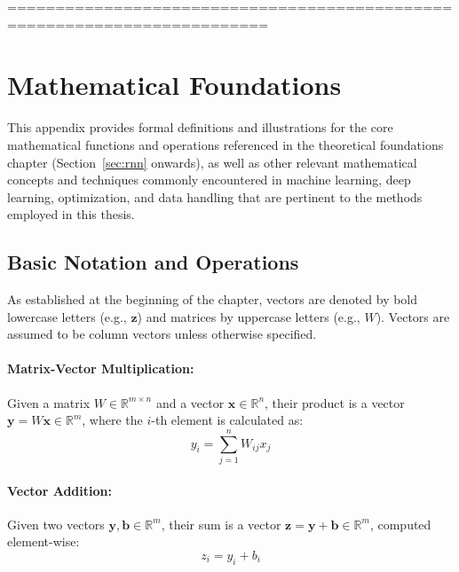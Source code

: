 =========================================================================
\section{Mathematical Foundations}
\label{app:math_foundations}

This appendix provides formal definitions and illustrations for the core mathematical functions and operations referenced in the theoretical foundations chapter (Section~\ref{sec:rnn} onwards), as well as other relevant mathematical concepts and techniques commonly encountered in machine learning, deep learning, optimization, and data handling that are pertinent to the methods employed in this thesis. %

\subsection{Basic Notation and Operations}
As established at the beginning of the chapter, vectors are denoted by bold lowercase letters (e.g., \( \bm{z} \)) and matrices by uppercase letters (e.g., \( W \)). Vectors are assumed to be column vectors unless otherwise specified.

\paragraph{Matrix-Vector Multiplication:}
Given a matrix \( W \in \mathbb{R}^{m \times n} \) and a vector \( \bm{x} \in \mathbb{R}^n \), their product is a vector \( \bm{y} = W\bm{x} \in \mathbb{R}^m \), where the \( i \)-th element is calculated as:
\begin{equation}
  y_i = \sum_{j=1}^{n} W_{ij} x_j
\end{equation}

\paragraph{Vector Addition:}
Given two vectors \( \bm{y}, \bm{b} \in \mathbb{R}^m \), their sum is a vector \( \bm{z} = \bm{y} + \bm{b} \in \mathbb{R}^m \), computed element-wise:
\begin{equation}
  z_i = y_i + b_i
\end{equation}

